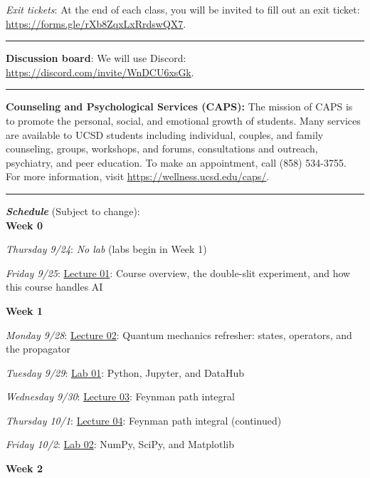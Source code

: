 \documentclass[12pt]{article}
\begin{document}
\emph{Exit tickets}: At the end of each class, you will be invited to fill out an exit ticket: \href{https://forms.gle/rXb8ZqxLxRrdswQX7}{https://forms.gle/rXb8ZqxLxRrdswQX7}.

\begin{center}
  \rule{\textwidth}{0.5pt}
\end{center}

\noindent\textbf{Discussion board}: We will use Discord: \href{https://discord.com/invite/WnDCU6xsGk}{https://discord.com/invite/WnDCU6xsGk}.

\begin{center}
  \rule{\textwidth}{0.5pt}
\end{center}

\noindent\textbf{Counseling and Psychological Services (CAPS):} The mission of CAPS is to promote the personal, social, and emotional growth of students.
Many services are available to UCSD students including individual, couples, and family counseling, groups, workshops, and forums, consultations and outreach, psychiatry, and peer education.
To make an appointment, call (858) 534-3755.
For more information, visit \href{https://wellness.ucsd.edu/caps/}{https://wellness.ucsd.edu/caps/}.

\begin{center}
  \rule{\textwidth}{0.5pt}
\end{center}

\noindent\textbf{\emph{Schedule}} (Subject to change):\\

\noindent\textbf{Week 0}

\emph{Thursday 9/24}: \emph{No lab} (labs begin in Week 1)

\emph{Friday 9/25}: \underline{Lecture 01}: Course overview, the double-slit experiment, and how this course handles AI

\noindent\textbf{Week 1}

\emph{Monday 9/28}: \underline{Lecture 02}: Quantum mechanics refresher: states, operators, and the propagator

\emph{Tuesday 9/29}: \underline{Lab 01}: Python, Jupyter, and DataHub

\emph{Wednesday 9/30}: \underline{Lecture 03}: Feynman path integral

\emph{Thursday 10/1}: \underline{Lecture 04}: Feynman path integral (continued)

\emph{Friday 10/2}: \underline{Lab 02}: NumPy, SciPy, and Matplotlib

\noindent\textbf{Week 2}
\end{document}
